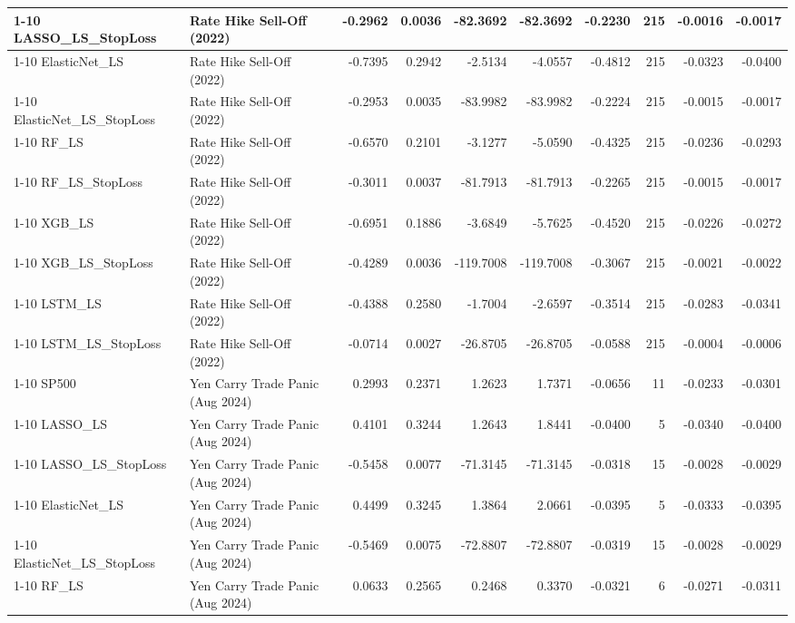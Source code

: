 \begin{tabular}{llrrrrrrrr}
\cline{1-10}
LASSO\_LS\_StopLoss & Rate Hike Sell-Off (2022) & -0.2962 & 0.0036 & -82.3692 & -82.3692 & -0.2230 & 215 & -0.0016 & -0.0017 \\
\cline{1-10}
ElasticNet\_LS & Rate Hike Sell-Off (2022) & -0.7395 & 0.2942 & -2.5134 & -4.0557 & -0.4812 & 215 & -0.0323 & -0.0400 \\
\cline{1-10}
ElasticNet\_LS\_StopLoss & Rate Hike Sell-Off (2022) & -0.2953 & 0.0035 & -83.9982 & -83.9982 & -0.2224 & 215 & -0.0015 & -0.0017 \\
\cline{1-10}
RF\_LS & Rate Hike Sell-Off (2022) & -0.6570 & 0.2101 & -3.1277 & -5.0590 & -0.4325 & 215 & -0.0236 & -0.0293 \\
\cline{1-10}
RF\_LS\_StopLoss & Rate Hike Sell-Off (2022) & -0.3011 & 0.0037 & -81.7913 & -81.7913 & -0.2265 & 215 & -0.0015 & -0.0017 \\
\cline{1-10}
XGB\_LS & Rate Hike Sell-Off (2022) & -0.6951 & 0.1886 & -3.6849 & -5.7625 & -0.4520 & 215 & -0.0226 & -0.0272 \\
\cline{1-10}
XGB\_LS\_StopLoss & Rate Hike Sell-Off (2022) & -0.4289 & 0.0036 & -119.7008 & -119.7008 & -0.3067 & 215 & -0.0021 & -0.0022 \\
\cline{1-10}
LSTM\_LS & Rate Hike Sell-Off (2022) & -0.4388 & 0.2580 & -1.7004 & -2.6597 & -0.3514 & 215 & -0.0283 & -0.0341 \\
\cline{1-10}
LSTM\_LS\_StopLoss & Rate Hike Sell-Off (2022) & -0.0714 & 0.0027 & -26.8705 & -26.8705 & -0.0588 & 215 & -0.0004 & -0.0006 \\
\cline{1-10}
SP500 & Yen Carry Trade Panic (Aug 2024) & 0.2993 & 0.2371 & 1.2623 & 1.7371 & -0.0656 & 11 & -0.0233 & -0.0301 \\
\cline{1-10}
LASSO\_LS & Yen Carry Trade Panic (Aug 2024) & 0.4101 & 0.3244 & 1.2643 & 1.8441 & -0.0400 & 5 & -0.0340 & -0.0400 \\
\cline{1-10}
LASSO\_LS\_StopLoss & Yen Carry Trade Panic (Aug 2024) & -0.5458 & 0.0077 & -71.3145 & -71.3145 & -0.0318 & 15 & -0.0028 & -0.0029 \\
\cline{1-10}
ElasticNet\_LS & Yen Carry Trade Panic (Aug 2024) & 0.4499 & 0.3245 & 1.3864 & 2.0661 & -0.0395 & 5 & -0.0333 & -0.0395 \\
\cline{1-10}
ElasticNet\_LS\_StopLoss & Yen Carry Trade Panic (Aug 2024) & -0.5469 & 0.0075 & -72.8807 & -72.8807 & -0.0319 & 15 & -0.0028 & -0.0029 \\
\cline{1-10}
RF\_LS & Yen Carry Trade Panic (Aug 2024) & 0.0633 & 0.2565 & 0.2468 & 0.3370 & -0.0321 & 6 & -0.0271 & -0.0311 \\

\end{tabular}
